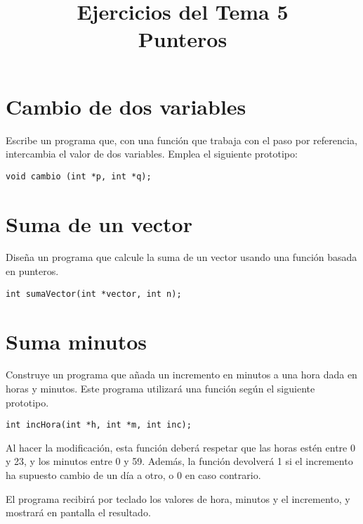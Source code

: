 \documentclass[a4paper]{article}
\date{}
\title{Ejercicios del Tema 5\\\medskip
\large Punteros}
\begin{document}
\maketitle


\section{Cambio de dos variables}
\label{sec:org96e3612}

Escribe un programa que, con una función que trabaja con el paso por referencia, intercambia el valor de dos variables. Emplea el siguiente prototipo:

\lstset{language=C,label= ,caption= ,captionpos=b,numbers=none}
\begin{lstlisting}
void cambio (int *p, int *q);
\end{lstlisting}


\section{Suma de un vector}
\label{sec:org50becca}

Diseña un programa que calcule la suma de un vector usando una función basada en punteros.

\lstset{language=C,label= ,caption= ,captionpos=b,numbers=none}
\begin{lstlisting}
int sumaVector(int *vector, int n);
\end{lstlisting}

\section{Suma minutos}
\label{sec:orgaa6208b}
Construye un programa que añada un incremento en minutos a una hora dada en horas y minutos. Este programa utilizará una función según el siguiente prototipo. 

\lstset{language=C,label= ,caption= ,captionpos=b,numbers=none}
\begin{lstlisting}
int incHora(int *h, int *m, int inc);
\end{lstlisting}
Al hacer la modificación, esta función deberá respetar que las horas estén entre 0 y 23, y los minutos entre 0 y 59. Además, la función devolverá 1 si el incremento ha supuesto cambio de un día a otro, o 0 en caso contrario.

El programa recibirá por teclado los valores de hora, minutos y el incremento, y mostrará en pantalla el resultado.
\end{document}
